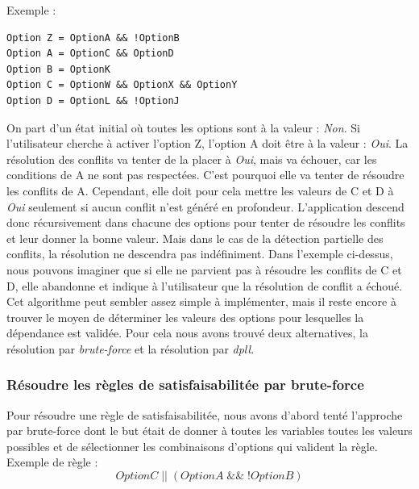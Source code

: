 ﻿\documentclass[17pts]{report}
\begin{document}
Exemple :
\begin{verbatim}
Option Z = OptionA && !OptionB
Option A = OptionC && OptionD
Option B = OptionK
Option C = OptionW && OptionX && OptionY
Option D = OptionL && !OptionJ
\end{verbatim}

On part d'un état initial où toutes les options sont à la valeur :
\textit{Non}.  Si l'utilisateur cherche à activer l'option Z, l'option A doit
être à la valeur : \textit{Oui}. La résolution des conflits va tenter de la
placer à \textit{Oui}, mais va échouer, car les conditions de A ne sont pas
respectées. C'est pourquoi elle va tenter de résoudre les conflits de A.
Cependant, elle doit pour cela mettre les valeurs de C et D à \textit{Oui}
seulement si aucun conflit n'est généré en profondeur. L'application descend
donc récursivement dans chacune des options pour tenter de résoudre les
conflits et leur donner la bonne valeur. Mais dans le cas de la détection
partielle des conflits, la résolution ne descendra pas indéfiniment. Dans
l'exemple ci-dessus, nous pouvons imaginer que si elle ne parvient pas à
résoudre les conflits de C et D, elle abandonne et indique à l'utilisateur que
la résolution de conflit a échoué.  \\

Cet algorithme peut sembler assez simple à implémenter, mais il reste encore à
trouver le moyen de déterminer les valeurs des options pour lesquelles la
dépendance est validée. Pour cela nous avons trouvé deux alternatives, la
résolution par \textit{brute-force} et la résolution par \textit{dpll}.


\subsubsection{Résoudre les règles de satisfaisabilitée par brute-force}
\label{ssub:Résoudre les règles de satisfaisabilité par brute-force}
Pour résoudre une règle de satisfaisabilitée, nous avons d'abord tenté
l'approche par brute-force dont le but était de donner à toutes les variables
toutes les valeurs possibles et de sélectionner les combinaisons d'options qui
valident la règle.  \\

Exemple de règle :
\begin{equation}
OptionC\;||\;(OptionA\;\&\&\;!OptionB)
\end{equation}
\end{document}

